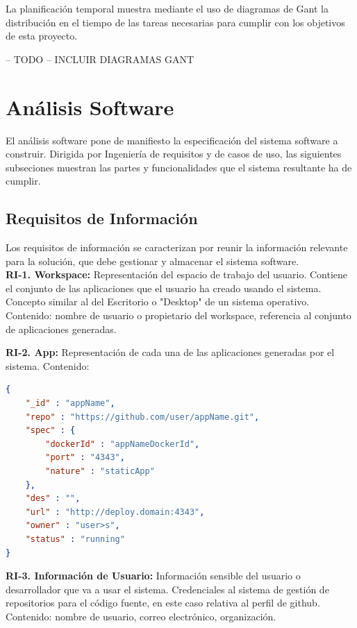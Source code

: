 \documentclass[a4paper,11pt]{book}
\begin{document}
La planificación temporal muestra mediante el uso de diagramas de Gant la distribución en el tiempo de las tareas necesarias para cumplir con los objetivos de esta proyecto.

--  TODO -- INCLUIR DIAGRAMAS GANT


\section{Análisis Software}

El análisis software pone de manifiesto la especificación del sistema software a construir. Dirigida por Ingeniería de requisitos y de casos de uso, las siguientes subseciones muestran las partes y funcionalidades que el sistema resultante ha de cumplir.

\subsection{Requisitos de Información }
Los requisitos de información se caracterizan por reunir la información relevante para la solución, que debe gestionar y almacenar el sistema software.\\

\textbf{RI-1. Workspace:} Representación del espacio de trabajo del usuario. Contiene el conjunto de las aplicaciones que el usuario ha creado usando el sistema. Concepto similar al del Escritorio o "Desktop" de un sistema operativo.
Contenido: nombre de usuario o propietario del workspace, referencia al conjunto de aplicaciones generadas.


\textbf{RI-2. App:} Representación de cada una de las aplicaciones generadas por el sistema.
Contenido:
\begin{lstlisting}[language=json,firstnumber=1]
{
    "_id" : "appName",
    "repo" : "https://github.com/user/appName.git",
    "spec" : {
        "dockerId" : "appNameDockerId",
        "port" : "4343",
        "nature" : "staticApp"
    },
    "des" : "",
    "url" : "http://deploy.domain:4343",
    "owner" : "user>s",
    "status" : "running"
}
\end{lstlisting}

\textbf{RI-3. Información de Usuario:} Información sensible del usuario o desarrollador que va a usar el sistema. Credenciales al sistema de gestión de repositorios para el código fuente, en este caso relativa al perfil de github.
Contenido: nombre de usuario, correo electrónico, organización. \\
\end{document}
